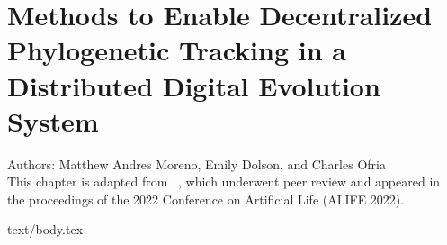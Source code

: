\chapter{Methods to Enable Decentralized Phylogenetic Tracking in a Distributed Digital Evolution System}
\label{ch:distributed-phylogeny}

\noindent
Authors: Matthew Andres Moreno, Emily Dolson, and Charles Ofria \\
This chapter is adapted from ~\citep{moreno2022hereditary}, which underwent peer review and appeared in the proceedings of the 2022 Conference on Artificial Life (ALIFE 2022).

{text/body.tex}
